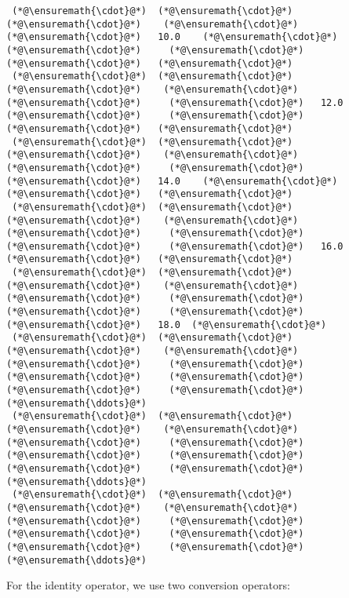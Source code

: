 \documentclass[12pt,landscape]{article}
\begin{document}
{{\begin{lstlisting}
 (*@\ensuremath{\cdot}@*)  (*@\ensuremath{\cdot}@*)   (*@\ensuremath{\cdot}@*)    (*@\ensuremath{\cdot}@*)    (*@\ensuremath{\cdot}@*)   10.0    (*@\ensuremath{\cdot}@*)     (*@\ensuremath{\cdot}@*)     (*@\ensuremath{\cdot}@*)     (*@\ensuremath{\cdot}@*)   (*@\ensuremath{\cdot}@*)
 (*@\ensuremath{\cdot}@*)  (*@\ensuremath{\cdot}@*)   (*@\ensuremath{\cdot}@*)    (*@\ensuremath{\cdot}@*)    (*@\ensuremath{\cdot}@*)     (*@\ensuremath{\cdot}@*)   12.0    (*@\ensuremath{\cdot}@*)     (*@\ensuremath{\cdot}@*)     (*@\ensuremath{\cdot}@*)   (*@\ensuremath{\cdot}@*)
 (*@\ensuremath{\cdot}@*)  (*@\ensuremath{\cdot}@*)   (*@\ensuremath{\cdot}@*)    (*@\ensuremath{\cdot}@*)    (*@\ensuremath{\cdot}@*)     (*@\ensuremath{\cdot}@*)     (*@\ensuremath{\cdot}@*)   14.0    (*@\ensuremath{\cdot}@*)     (*@\ensuremath{\cdot}@*)   (*@\ensuremath{\cdot}@*)
 (*@\ensuremath{\cdot}@*)  (*@\ensuremath{\cdot}@*)   (*@\ensuremath{\cdot}@*)    (*@\ensuremath{\cdot}@*)    (*@\ensuremath{\cdot}@*)     (*@\ensuremath{\cdot}@*)     (*@\ensuremath{\cdot}@*)     (*@\ensuremath{\cdot}@*)   16.0    (*@\ensuremath{\cdot}@*)   (*@\ensuremath{\cdot}@*)
 (*@\ensuremath{\cdot}@*)  (*@\ensuremath{\cdot}@*)   (*@\ensuremath{\cdot}@*)    (*@\ensuremath{\cdot}@*)    (*@\ensuremath{\cdot}@*)     (*@\ensuremath{\cdot}@*)     (*@\ensuremath{\cdot}@*)     (*@\ensuremath{\cdot}@*)     (*@\ensuremath{\cdot}@*)   18.0  (*@\ensuremath{\cdot}@*)
 (*@\ensuremath{\cdot}@*)  (*@\ensuremath{\cdot}@*)   (*@\ensuremath{\cdot}@*)    (*@\ensuremath{\cdot}@*)    (*@\ensuremath{\cdot}@*)     (*@\ensuremath{\cdot}@*)     (*@\ensuremath{\cdot}@*)     (*@\ensuremath{\cdot}@*)     (*@\ensuremath{\cdot}@*)     (*@\ensuremath{\cdot}@*)   (*@\ensuremath{\ddots}@*)
 (*@\ensuremath{\cdot}@*)  (*@\ensuremath{\cdot}@*)   (*@\ensuremath{\cdot}@*)    (*@\ensuremath{\cdot}@*)    (*@\ensuremath{\cdot}@*)     (*@\ensuremath{\cdot}@*)     (*@\ensuremath{\cdot}@*)     (*@\ensuremath{\cdot}@*)     (*@\ensuremath{\cdot}@*)     (*@\ensuremath{\cdot}@*)   (*@\ensuremath{\ddots}@*)
 (*@\ensuremath{\cdot}@*)  (*@\ensuremath{\cdot}@*)   (*@\ensuremath{\cdot}@*)    (*@\ensuremath{\cdot}@*)    (*@\ensuremath{\cdot}@*)     (*@\ensuremath{\cdot}@*)     (*@\ensuremath{\cdot}@*)     (*@\ensuremath{\cdot}@*)     (*@\ensuremath{\cdot}@*)     (*@\ensuremath{\cdot}@*)   (*@\ensuremath{\ddots}@*)
\end{lstlisting}}


For the identity operator, we use two conversion operators:


}
\end{document}
